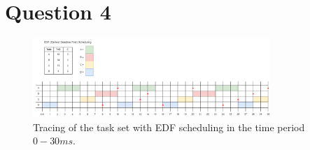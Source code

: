 \section{Question 4}

\begin{figure}[H]
    \centering
    \includegraphics[width=0.8\textwidth]{images/Ass1Q4.drawio.png}
    \caption{Tracing of the task set with EDF scheduling in the time period $0-30ms$.}
    \label{fig:Q4trace}
\end{figure}
    